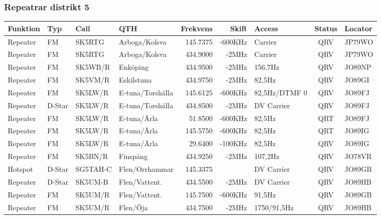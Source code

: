 \subsubsection{Repeatrar distrikt 5}
\begin{longtable}{llllrrlcl}

\textbf{Funktion} & \textbf{Typ}    & \textbf{Call}   & \textbf{QTH} & \textbf{Frekvens} & 
\textbf{Skift}    & \textbf{Access} & \textbf{Status} & \textbf{Locator} \\ \hline \endhead

Repeater & FM     & SK5RTG   & Arboga/Kolsva     & 145.7375 & -600KHz & Carrier       & QRV  & JP79WO \\
Repeater & FM     & SK5RTG   & Arboga/Kolsva     & 434.9000 & -2MHz   & Carrier       & QRV  & JP79WO \\
Repeater & FM     & SK5WB/R  & Enköping          & 434.9500 & -2MHz   & 156,7Hz       & QRV  & JO89NP \\
Repeater & FM     & SK5VM/R  & Eskilstuna        & 434.9750 & -2MHz   & 82,5Hz        & QRV  & JO89GI \\
Repeater & FM     & SK5LW/R  & E-tuna/Torshälla  & 145.6125 & -600KHz & 82,5Hz/DTMF 0 & QRV  & JO89FJ \\
Repeater & D-Star & SK5LW/R  & E-tuna/Torshälla  & 434.8500 & -2MHz   & DV Carrier    & QRV  & JO89FJ \\
Repeater & FM     & SK5LW/R  & E-tuna/Ärla       & 51.8500  & -600KHz & 82,5Hz        & QRT  & JO89FJ \\
Repeater & FM     & SK5LW/R  & E-tuna/Ärla       & 145.5750 & -600KHz & 82,5Hz        & QRT  & JO89IG \\
Repeater & FM     & SK5LW/R  & E-tuna/Ärla       & 29.6400  & -100KHz & 82,5Hz        & QRV  & JO89IG \\
Repeater & FM     & SK5BN/R  & Finspång          & 434.9250 & -2MHz   & 107,2Hz       & QRV  & JO78VR \\
Hotspot  & D-Star & SG5TAH-C & Flen/Orrhammar    & 145.3375 &         & DV Carrier    & QRV  & JO89GB \\
Repeater & D-Star & SK5UM-B  & Flen/Vattent.     & 434.5500 & -2MHz   & DV Carrier    & QRV  & JO89HB \\
Repeater & FM     & SK5UM/R  & Flen/Vattent.     & 145.7500 & -600KHz & 91,5Hz        & QRV  & JO89GB \\
Repeater & FM     & SK5UM/R  & Flen/Öja          & 434.7500 & -2MHz   & 1750/91,5Hz   & QRV  & JO89HB \\

\end{longtable}

